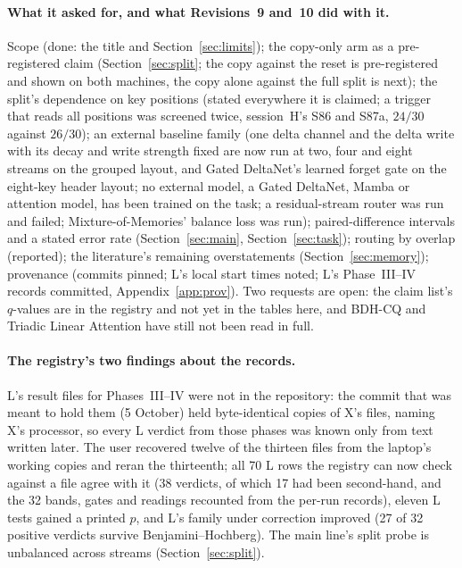 \documentclass[11pt]{article}
\begin{document}
\paragraph{What it asked for, and what Revisions~9 and~10 did with it.} Scope (done: the title and Section~\ref{sec:limits}); the copy-only arm as a pre-registered claim (Section~\ref{sec:split}; the copy against the reset is pre-registered and shown on both machines, the copy alone against the full split is next); the split's dependence on key positions (stated everywhere it is claimed; a trigger that reads all positions was screened twice, session~H's S86 and S87a, $24/30$ against $26/30$); an external baseline family (one delta channel and the delta write with its decay and write strength fixed are now run at two, four and eight streams on the grouped layout, and Gated DeltaNet's learned forget gate on the eight-key header layout; no external model, a Gated DeltaNet, Mamba or attention model, has been trained on the task; a residual-stream router was run and failed; Mixture-of-Memories' balance loss was run); paired-difference intervals and a stated error rate (Section~\ref{sec:main}, Section~\ref{sec:task}); routing by overlap (reported); the literature's remaining overstatements (Section~\ref{sec:memory}); provenance (commits pinned; L's local start times noted; L's Phase~III--IV records committed, Appendix~\ref{app:prov}). Two requests are open: the claim list's $q$-values are in the registry and not yet in the tables here, and BDH-CQ and Triadic Linear Attention have still not been read in full.

\paragraph{The registry's two findings about the records.} L's result files for Phases~III--IV were not in the repository: the commit that was meant to hold them (5 October) held byte-identical copies of X's files, naming X's processor, so every L verdict from those phases was known only from text written later. The user recovered twelve of the thirteen files from the laptop's working copies and reran the thirteenth; all 70 L rows the registry can now check against a file agree with it (38 verdicts, of which 17 had been second-hand, and the 32 bands, gates and readings recounted from the per-run records), eleven L tests gained a printed $p$, and L's family under correction improved (27 of 32 positive verdicts survive Benjamini--Hochberg). The main line's split probe is unbalanced across streams (Section~\ref{sec:split}).
\end{document}
